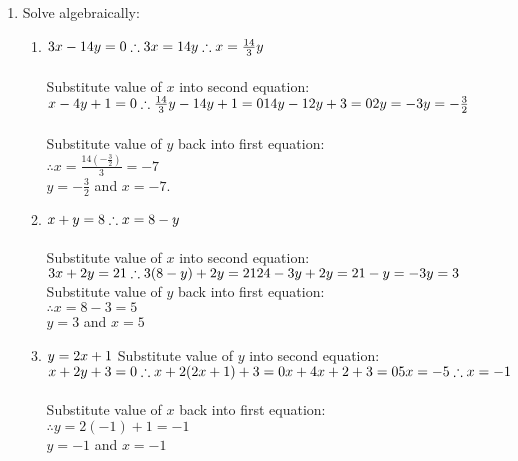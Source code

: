  \begin{solutions}{}{
\begin{enumerate}[itemsep=10pt, label=\textbf{\arabic*}. ] 
\item Solve algebraically: 
\begin{enumerate}[noitemsep, label=\textbf{(\alph*)} ] 
\item $3x-14y=0\\\therefore 3x=14y\\ \therefore x=\frac{14}{3}y$\\ \\
 Substitute value of $x$ into second equation: \\
$x-4y+1=0\\ \therefore \frac{14}{3}y-14y+1=0\\ 14y-12y+3=0\\2y=-3\\y=-\frac{3}{2}$\\ \\
Substitute value of $y$ back into first equation:\\
$\therefore x=\frac{14 (-\frac{3}{2})}{3} = -7$\\
$y=-\frac{3}{2}$ and $x=-7$.

\item $x+y=8 \\ \therefore x=8-y$\\ \\
Substitute value of $x$ into second equation:\\
$3x+2y=21 \\ \therefore 3(8-y)+2y = 21\\ 24-3y+2y=21\\ -y=-3\\y=3\\ \\$
Substitute value of $y$ back into first equation:\\
$\therefore x=8-3=5$\\
$y=3$ and $x=5$

\item $y=2x+1 \\ \\$
Substitute value of $y$ into second equation:\\
$ x+2y+3=0\\ \therefore x+2(2x+1)+3=0\\ 
x+4x+2+3=0\\
5x=-5\\
\therefore x=-1$\\ \\
Substitute value of $x$ back into first equation:\\
$\therefore y=2(-1)+1=-1$\\
$y=-1$ and $x=-1$


\end{enumerate}
\end{enumerate}}
\end{solutions}
